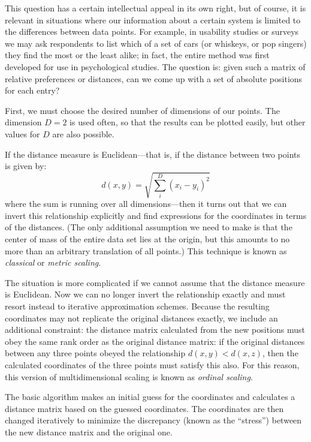 This question has a certain intellectual appeal in its own right, but
of course, it is relevant in situations where our information about a
certain system is limited to the differences between data points.  For
example, in usability studies or surveys we may ask respondents to
list which of a set of cars (or whiskeys, or pop singers) they find
the most or the least alike; in fact, the entire method was first
developed for use in psychological studies. The question is: given
such a matrix of relative preferences or distances, can we come up
with a set of absolute positions for each entry?

First, we must choose the desired number of dimensions of our points.
The dimension $D=2$ is used often, so that the results can be plotted
easily, but other values for $D$ are also possible.

If the distance measure is Euclidean---that is, if the distance
between two points is given by:
%
\[
d( x, y ) = \sqrt{ \sum_i^D ( x_i - y_i )^2 }
\]
% 
where the sum is running over all dimensions---then it turns out that
we can invert this relationship explicitly and find expressions for
the coordinates in terms of the distances. (The only additional
assumption we need to make is that the center of mass of the entire
data set lies at the origin, but this amounts to no more than an
arbitrary translation of all points.) This technique is known as
\emph{classical} or \emph{metric scaling}.

The situation is more complicated if we cannot assume that the
distance measure is Euclidean. Now we can no longer invert the
relationship exactly and must resort instead to iterative
approximation schemes.\vadjust{\pagebreak} Because the resulting coordinates may not
replicate the original distances exactly, we include an additional
constraint: the distance matrix calculated from the new positions must
obey the same rank order as the original distance matrix: if the
original distances between any three points obeyed the relationship
$d(x,y) < d(x,z)$, then the calculated coordinates of the three points
must satisfy this also.  For this reason, this version of
multidimensional scaling is known as \emph{ordinal scaling}.

The basic algorithm makes an initial guess for the coordinates and
calculates a distance matrix based on the guessed coordinates.  The
coordinates are then changed iteratively to minimize the discrepancy
(known as the ``stress'') between the new distance matrix and the
original one.

